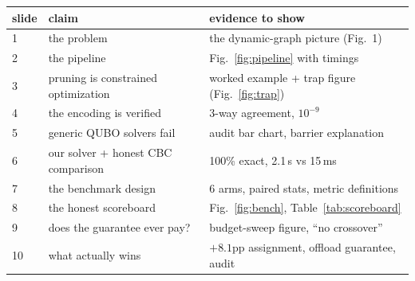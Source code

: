 \documentclass[11pt]{article}
\begin{document}
\begin{center}
\begin{tabular}{p{0.9cm}p{5.6cm}p{8.2cm}}
\toprule
slide & claim & evidence to show \\
\midrule
1 & the problem & the dynamic-graph picture (Fig.~1) \\
2 & the pipeline & Fig.~\ref{fig:pipeline} with timings \\
3 & pruning is constrained optimization & worked example + trap figure
(Fig.~\ref{fig:trap}) \\
4 & the encoding is verified & 3-way agreement, $10^{-9}$ \\
5 & generic QUBO solvers fail & audit bar chart, barrier explanation \\
6 & our solver + honest CBC comparison & 100\% exact, 2.1\,s vs 15\,ms \\
7 & the benchmark design & 6 arms, paired stats, metric definitions \\
8 & the honest scoreboard & Fig.~\ref{fig:bench}, Table~\ref{tab:scoreboard} \\
9 & does the guarantee ever pay? & budget-sweep figure, ``no crossover'' \\
10 & what actually wins & $+8.1$pp assignment, offload guarantee, audit \\
\bottomrule
\end{tabular}
\end{center}
\end{document}
